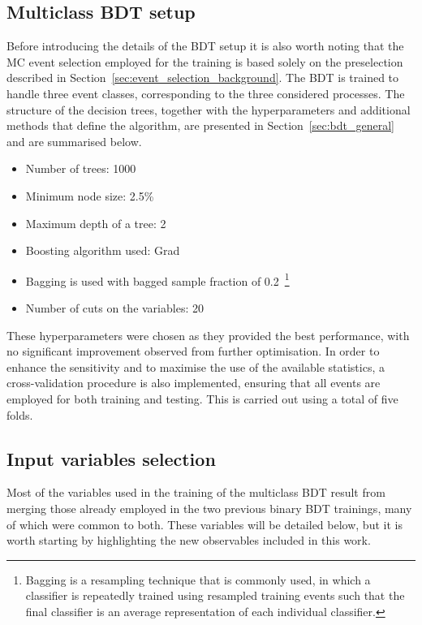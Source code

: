 \subsection{Multiclass BDT setup}

Before introducing the details of the BDT setup it is also worth noting that the MC event selection employed for the training is based solely on the preselection described in Section~\ref{sec:event_selection_background}. The BDT is trained to handle three event classes, corresponding to the three considered processes. The structure of the decision trees, together with the hyperparameters and additional methods that define the algorithm, are presented in Section~\ref{sec:bdt_general} and are summarised below.
\begin{itemize}
    \small
    \item Number of trees: 1000
    \item Minimum node size: 2.5\%
    \item Maximum depth of a tree: 2
    \item Boosting algorithm used: Grad
    \item Bagging is used with bagged sample fraction of 0.2~\footnote{Bagging is a resampling technique that is commonly used, in which a classifier is repeatedly trained using resampled training
    events such that the final classifier is an average representation of each individual classifier.}
    \item Number of cuts on the variables: 20
\end{itemize}
These hyperparameters were chosen as they provided the best performance, with no significant improvement observed from further optimisation. In order to enhance the sensitivity and to maximise the use of the available statistics, a cross-validation procedure is also implemented, ensuring that all events are employed for both training and testing. This is carried out using a total of five folds.

\subsection{Input variables selection}

Most of the variables used in the training of the multiclass BDT result from merging those already employed in the two previous binary BDT trainings, many of which were common to both. These variables will be detailed below, but it is worth starting by highlighting the new observables included in this work.

